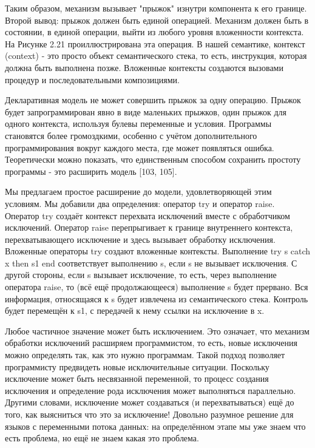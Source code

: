 Таким образом, механизм вызывает "прыжок" изнутри компонента к его границе. Второй вывод: прыжок должен быть единой операцией. Механизм должен быть в состоянии, в единой операции, выйти из любого уровня вложенности контекста. На Рисунке 2.21 проиллюстрирована эта операция. В нашей семантике, контекст (context) - это просто объект семантического стека, то есть, инструкция, которая должна быть выполнена позже. Вложенные контексты создаются вызовами процедур и последовательными композициями.

Декларативная модель не может совершить прыжок за одну операцию. Прыжок будет запрограммирован явно в виде маленьких прыжков, один прыжок для одного контекста, используя булевы переменные и условия. Программы становятся более громоздкими, особенно с учётом дополнительного программирования вокруг каждого места, где может появляться ошибка. Теоретически можно показать, что единственным способом сохранить простоту программы - это расширить модель [103, 105].

Мы предлагаем простое расширение до модели, удовлетворяющей этим условиям. Мы добавили два определения: оператор try и оператор raise. Оператор try создаёт контекст перехвата исключений вместе с обработчиком исключений. Оператор raise перепрыгивает к границе внутреннего контекста, перехватывающего исключение и здесь вызывает обработку исключения. Вложенные операторы try создают вложенные контексты. Выполнение try s catch x then s1 end соответствует выполнению s, если s не вызывает исключения. С другой стороны, если s вызывает исключение, то есть, через выполнение оператора raise, то (всё ещё продолжающееся) выполнение s будет прервано. Вся информация, относящаяся к s будет извлечена из семантического стека. Контроль будет перемещён к s1, с передачей к нему ссылки на исключение в x.

Любое частичное значение может быть исключением. Это означает, что механизм обработки исключений расширяем программистом, то есть, новые исключения можно определять так, как это нужно программам. Такой подход позволяет программисту предвидеть новые исключительные ситуации. Поскольку исключение может быть несвязанной переменной, то процесс создания исключения и определение рода исключения может выполняться параллельно. Другими словами, исключение может создаваться (и перехватываться) ещё до того, как выясниться что это за исключение! Довольно разумное решение для языков с переменными потока данных: на определённом этапе мы уже знаем что есть проблема, но ещё не знаем какая это проблема.

